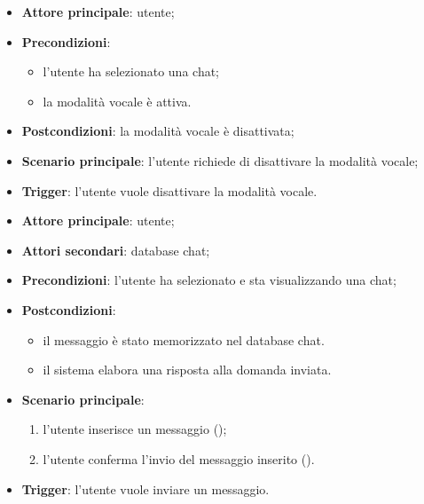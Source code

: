 \documentclass[10pt, a4paper]{article}
\begin{document}
    \begin{itemize}
        \item \textbf{Attore principale}: utente;
        \item \textbf{Precondizioni}: 
            \begin{itemize}
                \item l’utente ha selezionato una chat;
                \item la modalità vocale è attiva.
            \end{itemize}
        \item \textbf{Postcondizioni}: la modalità vocale è disattivata;
        \item \textbf{Scenario principale}: l’utente richiede di disattivare la modalità vocale;
        \item \textbf{Trigger}: l’utente vuole disattivare la modalità vocale.
    \end{itemize}
    
    \begin{itemize}
        \item \textbf{Attore principale}: utente;
        \item \textbf{Attori secondari}: database chat;
        \item \textbf{Precondizioni}: l’utente ha selezionato e sta visualizzando una chat;
        \item \textbf{Postcondizioni}: 
            \begin{itemize}
                \item il messaggio è stato memorizzato nel database chat.
                \item il sistema elabora una risposta alla domanda inviata.
            \end{itemize}
        \item \textbf{Scenario principale}:
        \begin{enumerate}
            \item l'utente inserisce un messaggio ();
            \item l’utente conferma l'invio del messaggio inserito ().
        \end{enumerate}
        \item \textbf{Trigger}: l’utente vuole inviare un messaggio.
    \end{itemize}
    
\end{document}

